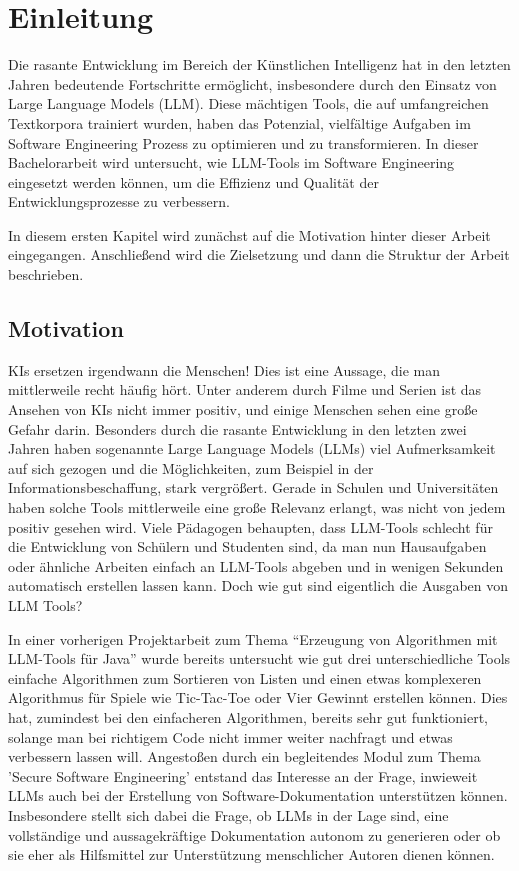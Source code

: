 
\chapter{Einleitung} 

Die rasante Entwicklung im Bereich der Künstlichen Intelligenz hat in den letzten Jahren bedeutende Fortschritte ermöglicht, 
insbesondere durch den Einsatz von Large Language Models (LLM). Diese mächtigen Tools, die auf umfangreichen Textkorpora 
trainiert wurden, haben das Potenzial, vielfältige Aufgaben im Software Engineering Prozess zu optimieren und zu transformieren. 
In dieser Bachelorarbeit wird untersucht, wie LLM-Tools im Software Engineering eingesetzt werden können, um die Effizienz und 
Qualität der Entwicklungsprozesse zu verbessern.

In diesem ersten Kapitel wird zunächst auf die Motivation hinter dieser Arbeit eingegangen. Anschließend wird die Zielsetzung 
und dann die Struktur der Arbeit beschrieben.

\section{Motivation}  \label{Motivation}

KIs ersetzen irgendwann die Menschen! Dies ist eine Aussage, die man mittlerweile recht häufig hört. Unter anderem durch Filme 
und Serien ist das Ansehen von KIs nicht immer positiv, und einige Menschen sehen eine große Gefahr darin. Besonders durch die 
rasante Entwicklung in den letzten zwei Jahren haben sogenannte Large Language Models (LLMs) viel Aufmerksamkeit auf sich gezogen 
und die Möglichkeiten, zum Beispiel in der Informationsbeschaffung, stark vergrößert. Gerade in Schulen und Universitäten haben 
solche Tools mittlerweile eine große Relevanz erlangt, was nicht von jedem positiv gesehen wird. Viele Pädagogen behaupten, dass 
LLM-Tools schlecht für die Entwicklung von Schülern und Studenten sind, da man nun Hausaufgaben oder ähnliche Arbeiten einfach an 
LLM-Tools abgeben und in wenigen Sekunden automatisch erstellen lassen kann. Doch wie gut sind eigentlich die Ausgaben von LLM Tools?

In einer vorherigen Projektarbeit zum Thema ``Erzeugung von Algorithmen mit LLM-Tools für Java'' wurde bereits untersucht 
wie gut drei unterschiedliche Tools einfache Algorithmen zum Sortieren von Listen und einen etwas komplexeren Algorithmus 
für Spiele wie Tic-Tac-Toe oder Vier Gewinnt erstellen können. Dies hat, zumindest bei den einfacheren Algorithmen, bereits 
sehr gut funktioniert, solange man bei richtigem Code nicht immer weiter nachfragt und etwas verbessern lassen will.
Angestoßen durch ein begleitendes Modul zum Thema 'Secure Software Engineering' entstand das Interesse an der Frage, inwieweit 
LLMs auch bei der Erstellung von Software-Dokumentation unterstützen können. Insbesondere stellt sich dabei die Frage, ob LLMs 
in der Lage sind, eine vollständige und aussagekräftige Dokumentation autonom zu generieren oder ob sie eher als Hilfsmittel zur 
Unterstützung menschlicher Autoren dienen können.


